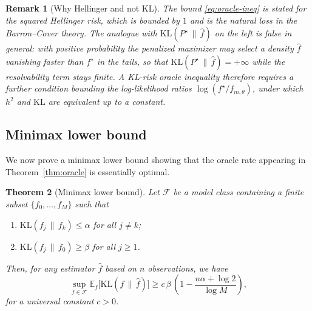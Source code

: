 \documentclass[12pt]{article}
\newtheorem{theorem}{Theorem}[section]
\newtheorem{remark}[theorem]{Remark}
\numberwithin{equation}{section}
\begin{document}
\begin{remark}[Why Hellinger and not KL]
	The bound \eqref{eq:oracle-ineq} is stated for the squared Hellinger risk,
	which is bounded by $1$ and is the natural loss in the Barron--Cover theory.
	The analogue with $\mathrm{KL}(P^{\star}\,\|\,\widehat f)$ on the left is
	\emph{false} in general: with positive probability the penalized maximizer
	may select a density $\widehat f$ vanishing faster than $f^{\star}$ in the
	tails, so that $\mathrm{KL}(P^{\star}\,\|\,\widehat f)=+\infty$ while the
	resolvability term stays finite. A KL-risk oracle inequality therefore
	requires a further condition bounding the log-likelihood ratios
	$\log(f^{\star}/f_{m,\theta})$, under which $h^2$ and $\mathrm{KL}$ are
	equivalent up to a constant.
\end{remark}
	
	\subsection{Minimax lower bound}
	
	We now prove a minimax lower bound showing that the oracle rate
	appearing in Theorem~\ref{thm:oracle} is essentially optimal.
	
	\begin{theorem}[Minimax lower bound]
		\label{thm:minimax-lower-proof}
		Let $\mathcal{F}$ be a model class containing a finite subset
		$\{f_0,\ldots,f_M\}$ such that
		\begin{enumerate}
			\item $\mathrm{KL}(f_j\,\|\,f_k) \le \alpha$ for all $j\ne k$;
			\item $\mathrm{KL}(f_j\,\|\,f_0) \ge \beta$ for all $j\ge 1$.
		\end{enumerate}
		Then, for any estimator $\widehat{f}$ based on $n$ observations, we have
		\begin{equation}
			\label{eq:minimax-lb}
			\sup_{f\in\mathcal{F}}
			\mathbb{E}_f\big[\mathrm{KL}(f\,\|\,\widehat{f})\big]
			\ge c\,\beta\,
			\left(1 - \frac{n\alpha + \log 2}{\log M}\right),
		\end{equation}
		for a universal constant $c>0$.
	\end{theorem}
	
\end{document}
